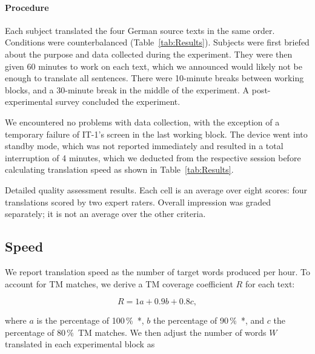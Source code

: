\documentclass[11pt]{article}
\newcommand{\todo}[1]{\textbf{\color{orange}{#1}}}
\newcommand{\Table}[1]{Table~\ref{tab:#1}}
\newcommand{\percent}{\,\%\ }
\begin{document}
\paragraph{Procedure}

Each subject translated the four German source texts in the same order. Conditions were counterbalanced (\Table{Results}). Subjects were first briefed about the purpose and data collected during the experiment. They were then given 60 minutes to work on each text, which we announced would likely not be enough to translate all sentences. There were 10-minute breaks between working blocks, and a 30-minute break in the middle of the experiment. A post-experimental survey concluded the experiment.

We encountered no problems with data collection, with the exception of a temporary failure of IT-1's screen in the last working block. The device went into standby mode, which was not reported immediately and resulted in a total interruption of 4 minutes, which we deducted from the respective session before calculating translation speed as shown in \Table{Results}.


\begin{table*}[t]
    \centering
    \renewcommand{\arraystretch}{1.2}
    \fontsize{10.1pt}{10.1pt}\selectfont
    
    \caption{Detailed quality assessment results. Each cell is an average over eight scores: four translations scored by two expert raters. Overall impression was graded separately; it is not an average over the other criteria.}
    \label{tab:Quality}
\end{table*}

\subsection{Speed}
\label{sec:Speed}

We report translation speed as the number of target words produced per hour. To account for TM matches, we derive a TM coverage coefficient $R$ for each text:

\begin{equation}
    R = 1a + 0.9b + 0.8c,
\end{equation}

\noindent where $a$ is the percentage of 100\percent*, $b$ the percentage of 90\percent*, and $c$ the percentage of 80\percent TM matches. We then adjust the number of words $W$ translated in each experimental block as
\end{document}
